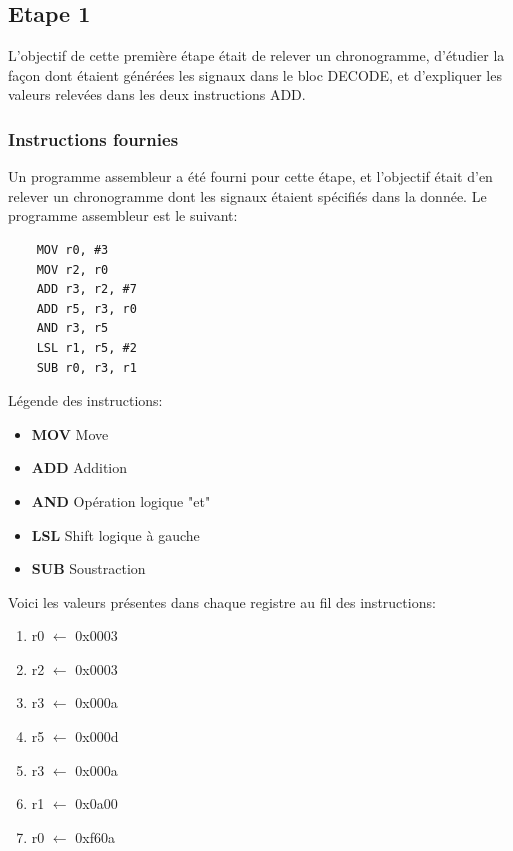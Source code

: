 \documentclass[a4paper]{article} %
\begin{document}
\subsection{Etape 1}
L'objectif de cette première étape était de relever un chronogramme, d'étudier la façon dont étaient générées les signaux dans le bloc DECODE, et d'expliquer les valeurs relevées dans les deux instructions ADD.
\subsubsection{Instructions fournies}
Un programme assembleur a été fourni pour cette étape, et l'objectif était d'en relever un chronogramme dont les signaux étaient spécifiés dans la donnée.
Le programme assembleur est le suivant:\medskip \\ 
\begin{center}
    \begin{lstlisting}
    MOV r0, #3
    MOV r2, r0
    ADD r3, r2, #7
    ADD r5, r3, r0
    AND r3, r5
    LSL r1, r5, #2
    SUB r0, r3, r1
    \end{lstlisting}
\end{center}


Légende des instructions:
\begin{itemize}
    \item \textbf{MOV} Move
    \item \textbf{ADD} Addition
    \item \textbf{AND} Opération logique "et"
    \item \textbf{LSL} Shift logique à gauche
    \item \textbf{SUB} Soustraction    
\end{itemize}
\medskip
Voici les valeurs présentes dans chaque registre au fil des instructions:
\begin{enumerate}
    \item r0 $\leftarrow$ 0x0003
    \item r2 $\leftarrow$ 0x0003
    \item r3 $\leftarrow$ 0x000a
    \item r5 $\leftarrow$ 0x000d
    \item r3 $\leftarrow$ 0x000a
    \item r1 $\leftarrow$ 0x0a00
    \item r0 $\leftarrow$ 0xf60a
\end{enumerate}
\end{document}
